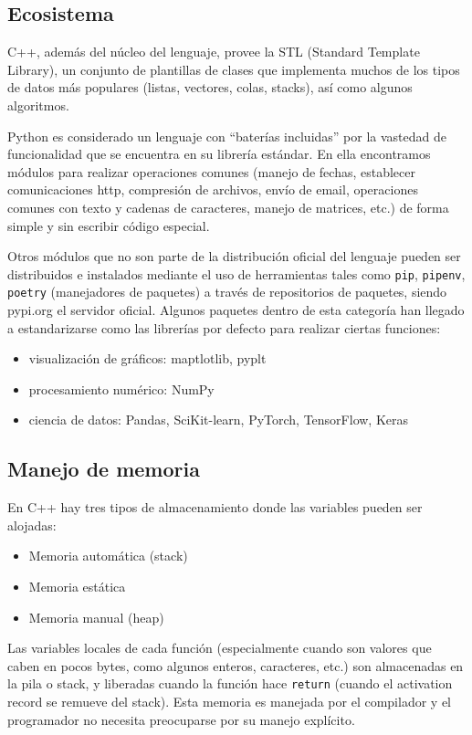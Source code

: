 \subsection{Ecosistema}

C++, además del núcleo del lenguaje, provee la STL (Standard Template Library),
un conjunto de plantillas de clases que implementa muchos de los tipos de datos
más populares (listas, vectores, colas, stacks), así como algunos algoritmos. 

Python es considerado un lenguaje con ``baterías incluidas'' por la vastedad de
funcionalidad que se encuentra en su librería estándar. En ella encontramos
módulos para realizar operaciones comunes (manejo de fechas, establecer
comunicaciones http, compresión de archivos, envío de email, operaciones
comunes con texto y cadenas de caracteres, manejo de matrices, etc.) de forma
simple y sin escribir código especial.

Otros módulos que no son parte de la distribución oficial del lenguaje pueden
ser distribuidos e instalados mediante el uso de herramientas tales como
\verb!pip!, \verb!pipenv!, \verb!poetry! (manejadores de paquetes) a través de
repositorios de paquetes, siendo pypi.org el servidor oficial. Algunos paquetes
dentro de esta categoría han llegado a estandarizarse como las librerías por
defecto para realizar ciertas funciones:

\begin{itemize}
    \item visualización de gráficos: maptlotlib, pyplt
    \item procesamiento numérico: NumPy
    \item ciencia de datos: Pandas, SciKit-learn, PyTorch, TensorFlow, Keras
\end{itemize}

\subsection{Manejo de memoria}

En C++ hay tres tipos de almacenamiento donde las variables pueden ser
alojadas:

\begin{itemize}
    \item Memoria automática (stack)
    \item Memoria estática
    \item Memoria manual (heap)
\end{itemize}

Las variables locales de cada función (especialmente cuando son valores que
caben en pocos bytes, como algunos enteros, caracteres, etc.) son almacenadas
en la pila o stack, y liberadas cuando la función hace \verb!return! (cuando el
activation record se remueve del stack). Esta memoria es manejada por el
compilador y el programador no necesita preocuparse por su manejo explícito.

